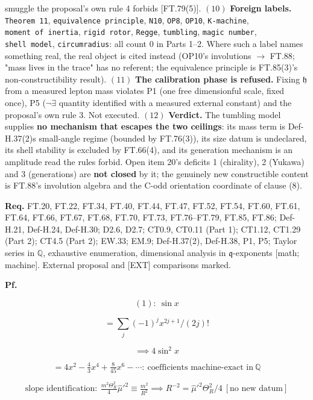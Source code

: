 \documentclass[11pt,openany]{report}
\theoremstyle{canonplain}
\theoremstyle{canondef}
\begin{document}
smuggle the proposal's own rule 4 forbids [FT.79(5)]. $(10)$ \textbf{Foreign labels.} \texttt{Theorem\ 11}, \texttt{equivalence\ principle}, \texttt{N10}, \texttt{OP8}, \texttt{OP10}, \texttt{K-machine}, \texttt{moment\ of\ inertia}, \texttt{rigid\ rotor}, \texttt{Regge}, \texttt{tumbling}, \texttt{magic\ number}, \texttt{shell\ model}, \texttt{circumradius}: all count $0$ in Parts 1–2. Where such a label names something real, the real object is cited instead (OP10's involutions $\to$ FT.88; "mass lives in the trace" has no referent; the equivalence principle is FT.85(3)'s non-constructibility result). $(11)$ \textbf{The calibration phase is refused.} Fixing $\mathfrak h$ from a measured lepton mass violates P1 (one free dimensionful scale, fixed once), P5 ($\neg\exists$ quantity identified with a measured external constant) and the proposal's own rule 3. Not executed. $(12)$ \textbf{Verdict.} The tumbling model supplies \textbf{no mechanism that escapes the two ceilings}: its mass term is Def-H.37(2)s small-angle regime (bounded by FT.76(3)), its size datum is undeclared, its shell stability is excluded by FT.66(4), and its generation mechanism is an amplitude read the rules forbid. Open item 20's deficits 1 (chirality), 2 (Yukawa) and 3 (generations) are \textbf{not closed} by it; the genuinely new constructible content is FT.88's involution algebra and the C-odd orientation coordinate of clause (8).

\textbf{Req.} FT.20, FT.22, FT.34, FT.40, FT.44, FT.47, FT.52, FT.54, FT.60, FT.61, FT.64, FT.66, FT.67, FT.68, FT.70, FT.73, FT.76–FT.79, FT.85, FT.86; Def-H.21, Def-H.24, Def-H.30; D2.6, D2.7; CT0.9, CT0.11 (Part 1); CT1.12, CT1.29 (Part 2); CT4.5 (Part 2); EW.33; EM.9; Def-H.37(2), Def-H.38, P1, P5; Taylor series in $\mathbb Q$, exhaustive enumeration, dimensional analysis in $\mathfrak q$-exponents [math; machine]. External proposal and [EXT] comparisons marked.

\textbf{Pf.}

\[
(1):\ \sin x
\]

\[
= \sum_j(-1)^jx^{2j+1}/(2j)!
\]

\[
\implies 4\sin^2x
\]

\[
= 4x^2-\tfrac43x^4+\tfrac{8}{45}x^6-\cdots:\ \text{coefficients machine-exact in}\ \mathbb Q
\]

\[
\text{slope identification}:\ \tfrac{m^2\Theta_R^2}{4}\hat\mu'^2\equiv\tfrac{m^2}{R^2}\implies R^{-2}=\hat\mu'^2\Theta_R^2/4\ [\text{no new datum}]
\]
\end{document}
